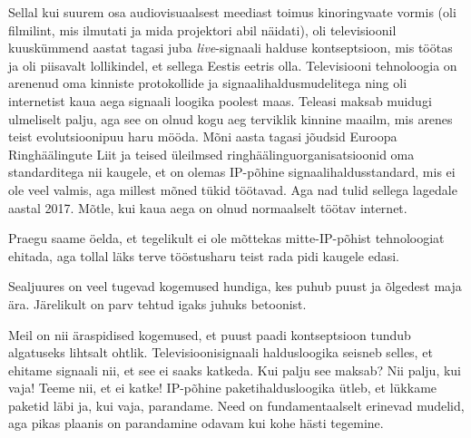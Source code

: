 
Sellal kui suurem osa audiovisuaalsest meediast toimus kinoringvaate vormis (oli 
filmilint, mis ilmutati ja mida projektori abil näidati), oli 
televisioonil kuuskümmend aastat tagasi juba \emph{live}-signaali halduse kontseptsioon, mis töötas ja oli 
piisavalt lollikindel, et sellega Eestis eetris olla. 
Televisiooni tehnoloogia on arenenud oma kinniste protokollide ja 
signaalihaldusmudelitega ning oli internetist kaua aega signaali 
loogika poolest maas. Teleasi maksab muidugi ulmeliselt palju, aga 
see on olnud kogu aeg terviklik kinnine maailm, mis arenes teist 
evolutsioonipuu haru mööda. Mõni aasta tagasi jõudsid Euroopa 
Ringhäälingute Liit ja teised üleilmsed ringhäälinguorganisatsioonid oma standarditega nii kaugele, et on olemas IP-põhine 
signaalihaldusstandard, mis ei ole veel valmis, aga millest mõned tükid 
töötavad. Aga nad tulid sellega lagedale aastal 2017. Mõtle, kui kaua aega on olnud 
normaalselt töötav internet.

Praegu saame öelda, et tegelikult ei ole mõttekas mitte-IP-põhist 
tehnoloogiat ehitada, aga tollal läks terve tööstusharu teist rada pidi kaugele 
edasi.


Sealjuures on veel tugevad kogemused hundiga, kes puhub puust ja õlgedest 
maja ära. Järelikult on parv tehtud igaks juhuks betoonist. 

Meil on nii äraspidised kogemused, et puust paadi kontseptsioon 
tundub algatuseks lihtsalt ohtlik. Televisioonisignaali haldusloogika seisneb selles, et ehitame 
signaali nii, et see ei saaks katkeda. Kui palju see maksab? Nii palju, kui vaja! Teeme 
nii, et ei katke! IP-põhine paketihaldusloogika ütleb, et lükkame paketid läbi ja, kui vaja, parandame. Need on 
fundamentaalselt erinevad mudelid, aga pikas plaanis on parandamine 
odavam kui kohe hästi tegemine.
